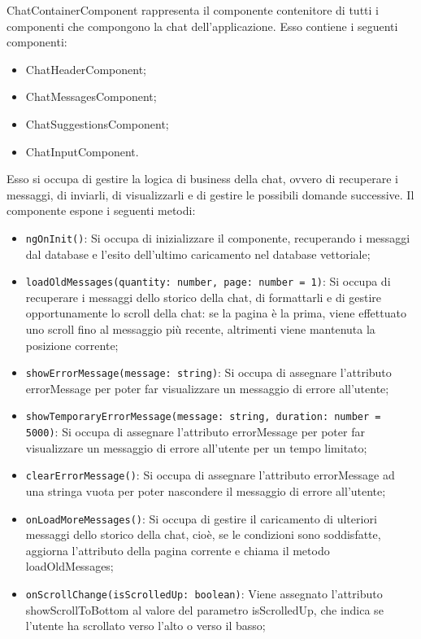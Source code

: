 \label{sec:chat_container_component}
ChatContainerComponent rappresenta il componente contenitore di tutti i componenti che compongono la chat dell'applicazione. Esso contiene i seguenti componenti:
\begin{itemize}
    \item ChatHeaderComponent;
    \item ChatMessagesComponent;
    \item ChatSuggestionsComponent;
    \item ChatInputComponent.
\end{itemize}
Esso si occupa di gestire la logica di business della chat, ovvero di recuperare i messaggi, di inviarli, di visualizzarli e di gestire le possibili domande successive.
Il componente espone i seguenti metodi:
\begin{itemize}
    \item \texttt{ngOnInit()}: Si occupa di inizializzare il componente, recuperando i messaggi dal database e l'esito dell'ultimo caricamento nel database vettoriale;
    \item \texttt{loadOldMessages(quantity: number, page: number = 1)}: Si occupa di recuperare i messaggi  dello storico della chat, di formattarli e di gestire opportunamente lo scroll della chat: se la pagina è la prima, viene effettuato uno scroll fino al messaggio più recente, altrimenti viene mantenuta la posizione corrente;
    \item \texttt{showErrorMessage(message: string)}: Si occupa di assegnare l'attributo errorMessage per poter far visualizzare un messaggio di errore all'utente;
    \item \texttt{showTemporaryErrorMessage(message: string, duration: number = 5000)}: Si occupa di assegnare l'attributo errorMessage per poter far visualizzare un messaggio di errore all'utente per un tempo limitato;
    \item \texttt{clearErrorMessage()}: Si occupa di assegnare l'attributo errorMessage ad una stringa vuota per poter nascondere il messaggio di errore all'utente;
    \item \texttt{onLoadMoreMessages()}: Si occupa di gestire il caricamento di ulteriori messaggi dello storico della chat, cioè, se le condizioni sono soddisfatte, aggiorna l'attributo della pagina corrente e chiama il metodo loadOldMessages;
    \item \texttt{onScrollChange(isScrolledUp: boolean)}: Viene assegnato l'attributo showScrollToBottom al valore del parametro isScrolledUp, che indica se l'utente ha scrollato verso l'alto o verso il basso;

\end{itemize}
